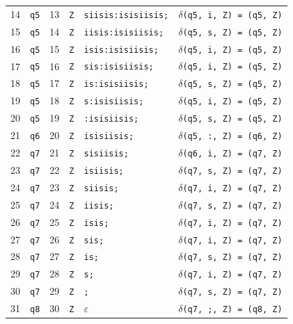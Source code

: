 \begin{table}[t]
\begin{tabularx}{\textwidth}{@{}rllllX@{}}
14 & \texttt{q5} & 13 & \texttt{Z} & \texttt{siisis:isisiisis;} & \texttt{$\delta$(q5, i, Z) = (q5, Z)} \\
15 & \texttt{q5} & 14 & \texttt{Z} & \texttt{iisis:isisiisis;} & \texttt{$\delta$(q5, s, Z) = (q5, Z)} \\
16 & \texttt{q5} & 15 & \texttt{Z} & \texttt{isis:isisiisis;} & \texttt{$\delta$(q5, i, Z) = (q5, Z)} \\
17 & \texttt{q5} & 16 & \texttt{Z} & \texttt{sis:isisiisis;} & \texttt{$\delta$(q5, i, Z) = (q5, Z)} \\
18 & \texttt{q5} & 17 & \texttt{Z} & \texttt{is:isisiisis;} & \texttt{$\delta$(q5, s, Z) = (q5, Z)} \\
19 & \texttt{q5} & 18 & \texttt{Z} & \texttt{s:isisiisis;} & \texttt{$\delta$(q5, i, Z) = (q5, Z)} \\
20 & \texttt{q5} & 19 & \texttt{Z} & \texttt{:isisiisis;} & \texttt{$\delta$(q5, s, Z) = (q5, Z)} \\
21 & \texttt{q6} & 20 & \texttt{Z} & \texttt{isisiisis;} & \texttt{$\delta$(q5, :, Z) = (q6, Z)} \\
22 & \texttt{q7} & 21 & \texttt{Z} & \texttt{sisiisis;} & \texttt{$\delta$(q6, i, Z) = (q7, Z)} \\
23 & \texttt{q7} & 22 & \texttt{Z} & \texttt{isiisis;} & \texttt{$\delta$(q7, s, Z) = (q7, Z)} \\
24 & \texttt{q7} & 23 & \texttt{Z} & \texttt{siisis;} & \texttt{$\delta$(q7, i, Z) = (q7, Z)} \\
25 & \texttt{q7} & 24 & \texttt{Z} & \texttt{iisis;} & \texttt{$\delta$(q7, s, Z) = (q7, Z)} \\
26 & \texttt{q7} & 25 & \texttt{Z} & \texttt{isis;} & \texttt{$\delta$(q7, i, Z) = (q7, Z)} \\
27 & \texttt{q7} & 26 & \texttt{Z} & \texttt{sis;} & \texttt{$\delta$(q7, i, Z) = (q7, Z)} \\
28 & \texttt{q7} & 27 & \texttt{Z} & \texttt{is;} & \texttt{$\delta$(q7, s, Z) = (q7, Z)} \\
29 & \texttt{q7} & 28 & \texttt{Z} & \texttt{s;} & \texttt{$\delta$(q7, i, Z) = (q7, Z)} \\
30 & \texttt{q7} & 29 & \texttt{Z} & \texttt{;} & \texttt{$\delta$(q7, s, Z) = (q7, Z)} \\
31 & \texttt{q8} & 30 & \texttt{Z} & \texttt{$\varepsilon$} & \texttt{$\delta$(q7, ;, Z) = (q8, Z)} \\
\bottomrule
\end{tabularx}
\end{table}


